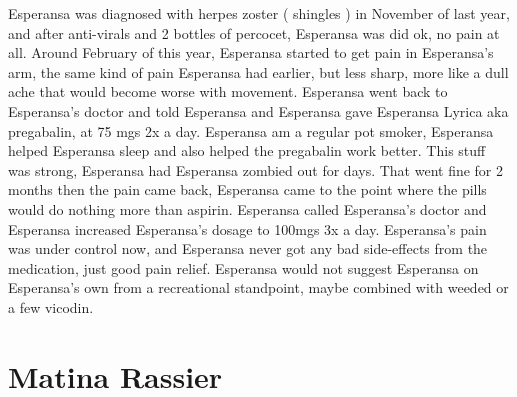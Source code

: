 \documentclass[12pt]{book}
\begin{document}
Esperansa was diagnosed with herpes zoster ( shingles ) in November of last year, and after anti-virals and 2 bottles of percocet, Esperansa was did ok, no pain at all. Around February of this year, Esperansa started to get pain in Esperansa's arm, the same kind of pain Esperansa had earlier, but less sharp, more like a dull ache that would become worse with movement. Esperansa went back to Esperansa's doctor and told Esperansa and Esperansa gave Esperansa Lyrica aka pregabalin, at 75 mgs 2x a day. Esperansa am a regular pot smoker, Esperansa helped Esperansa sleep and also helped the pregabalin work better. This stuff was strong, Esperansa had Esperansa zombied out for days. That went fine for 2 months then the pain came back, Esperansa came to the point where the pills would do nothing more than aspirin. Esperansa called Esperansa's doctor and Esperansa increased Esperansa's dosage to 100mgs 3x a day. Esperansa's pain was under control now, and Esperansa never got any bad side-effects from the medication, just good pain relief. Esperansa would not suggest Esperansa on Esperansa's own from a recreational standpoint, maybe combined with weeded or a few vicodin.



\chapter{Matina Rassier}
\end{document}
